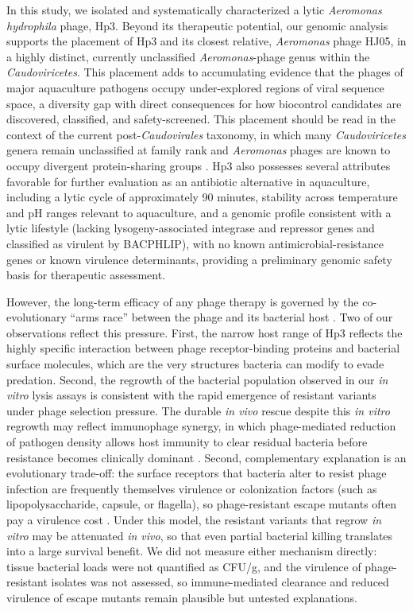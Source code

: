 In this study, we isolated and systematically characterized a lytic
\emph{Aeromonas hydrophila} phage, Hp3. Beyond its therapeutic
potential, our genomic analysis supports the placement of Hp3 and its
closest relative, \emph{Aeromonas} phage HJ05, in a highly distinct,
currently unclassified \emph{Aeromonas}-phage genus within the
\emph{Caudoviricetes}. This placement adds to accumulating evidence that
the phages of major aquaculture pathogens occupy under-explored regions
of viral sequence space, a diversity gap with direct consequences for how
biocontrol candidates are discovered, classified, and safety-screened. This placement should be read in the context of
the current post-\emph{Caudovirales} taxonomy, in which many
\emph{Caudoviricetes} genera remain unclassified at family rank and
\emph{Aeromonas} phages are known to occupy divergent protein-sharing
groups \citep{2023-Abolishment_Turner,2022-Characterization_Bujak}. Hp3
also possesses several attributes favorable for further evaluation as an
antibiotic alternative in aquaculture, including a lytic cycle of
approximately 90 minutes, stability across temperature and pH ranges
relevant to aquaculture, and a genomic profile consistent with a lytic
lifestyle (lacking lysogeny-associated integrase and repressor genes and
classified as virulent by BACPHLIP), with no known
antimicrobial-resistance genes or known virulence
determinants, providing a preliminary genomic safety basis for
therapeutic assessment.

However, the long-term efficacy of any phage therapy is governed by the co-evolutionary ``arms race'' between the phage and its
bacterial host \citep{2023-Developing_Oromi-Bosch}. Two of our
observations reflect this pressure. First, the narrow host range of Hp3
reflects the highly specific interaction between phage receptor-binding
proteins and bacterial surface molecules, which are the very structures
bacteria can modify to evade predation. Second, the regrowth of the
bacterial population observed in our \emph{in vitro} lysis assays is consistent
with the rapid emergence of resistant variants under phage selection
pressure. The durable \emph{in vivo} rescue despite this \emph{in vitro} regrowth may
reflect immunophage synergy, in which phage-mediated reduction of
pathogen density allows host immunity to clear residual bacteria before
resistance becomes clinically dominant \citep{2018-Phage_Torres-Barcelo}.
Second, complementary explanation is an evolutionary trade-off: the
surface receptors that bacteria alter to resist phage infection are
frequently themselves virulence or colonization factors (such as
lipopolysaccharide, capsule, or flagella), so phage-resistant escape
mutants often pay a virulence cost \citep{2015-Virulence_Leon}. Under
this model, the resistant variants that regrow \emph{in vitro} may be
attenuated \emph{in vivo}, so that even partial bacterial killing
translates into a large survival benefit. We did not measure either
mechanism directly: tissue bacterial loads were not quantified as CFU/g,
and the virulence of phage-resistant isolates was not assessed, so
immune-mediated clearance and reduced virulence of escape mutants remain
plausible but untested explanations.

